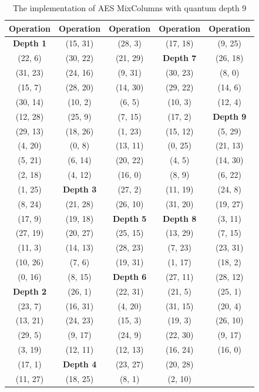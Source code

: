 \begin{table}[htbp]
\centering
\begin{tabular}{||c c c c c||} 
 \hline
 Operation & Operation & Operation & Operation & Operation \\ [0.5ex] 
 \hline\hline
 \textbf{Depth 1} & (15, 31) & (28, 3) & (17, 18) & (9, 25) \\ 
 (22, 6) & (30, 22) & (21, 29) & \textbf{Depth 7} & (26, 18) \\
 (31, 23) & (24, 16) & (9, 31) & (30, 23) & (8, 0) \\
 (15, 7) & (28, 20) & (14, 30) & (29, 22) & (14, 6) \\
 (30, 14) & (10, 2) & (6, 5) & (10, 3) & (12, 4)\\
 (12, 28) & (25, 9)& (7, 15) & (17, 2) & \textbf{Depth 9}\\
 (29, 13) & (18, 26) & (1, 23) & (15, 12) & (5, 29)\\
 (4, 20) & (0, 8) & (13, 11) & (0, 25) & (21, 13)\\
 (5, 21) & (6, 14) & (20, 22) & (4, 5) & (14, 30)\\
 (2, 18) & (4, 12) & (16, 0) & (8, 9) & (6, 22)\\
 (1, 25) & \textbf{Depth 3} & (27, 2) & (11, 19) & (24, 8)\\
 (8, 24) & (21, 28) & (26, 10) & (31, 20) & (19, 27)\\
 (17, 9) & (19, 18) & \textbf{Depth 5} & \textbf{Depth 8} & (3, 11)\\
 (27, 19) & (20, 27) & (25, 15) & (13, 29) & (7, 15)\\
 (11, 3) & (14, 13) & (28, 23) & (7, 23) & (23, 31)\\
 (10, 26) & (7, 6) & (19, 31) & (1, 17) & (18, 2)\\
 (0, 16) & (8, 15) & \textbf{Depth 6} & (27, 11) & (28, 12)\\
 \textbf{Depth 2} & (26, 1) & (22, 31) & (21, 5) & (25, 1)\\
 (23, 7) & (16, 31) & (4, 20) & (31, 15) & (20, 4)\\
 (13, 21) & (24, 23) & (15, 3) & (19, 3) & (26, 10)\\
 (29, 5) & (9, 17) & (24, 9) & (22, 30) & (9, 17)\\
 (3, 19) & (12, 11) & (12, 13) & (16, 24) & (16, 0)\\
 (17, 1) & \textbf{Depth 4} & (23, 27) & (20, 28) & \\
 (11, 27) & (18, 25) & (8, 1) & (2, 10) & \\
 \hline
\end{tabular}
\caption{The implementation of AES MixColumns with quantum depth 9}
\label{tab:depth-9-operations-aes-mixcolumns}
\end{table}

